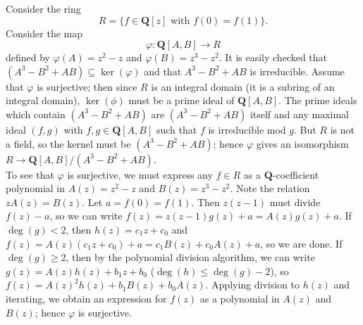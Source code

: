 \begin{example}
\label{example-affine-open-not-standard}
Consider the ring
$$
R = \{ f \in \mathbf{Q}[z]\text{ with }f(0) = f(1) \}.
$$
Consider the map
$$
\varphi:\mathbf{Q}[A,B]\to R
$$
defined by $\varphi(A)=z^2-z$ and $\varphi(B)=z^3-z^2$.  It is
easily checked that $(A^3-B^2+AB)\subseteq\ker(\varphi)$ and that
$A^3-B^2+AB$ is irreducible.  Assume that $\varphi$ is surjective;
then since $R$ is an integral domain (it is a subring of an integral
domain), $\ker(\phi)$ must be a prime ideal of $\mathbf{Q}[A,B]$.
The prime ideals which contain $(A^3-B^2+AB)$ are $(A^3-B^2+AB)$
itself and any maximal ideal $(f,g)$ with $f,g\in\mathbf{Q}[A,B]$
such that $f$ is irreducible mod $g$. But $R$ is not a field, so the
kernel must be $(A^3-B^2+AB)$; hence $\varphi$ gives an isomorphism
$R\to\mathbf{Q}[A,B]/(A^3-B^2+AB)$.\\
\indent To see that $\varphi$ is surjective, we must express any
$f\in R$ as a $\mathbf{Q}$-coefficient polynomial in $A(z)=z^2-z$
and $B(z)=z^3-z^2$. Note the relation $zA(z)=B(z)$. Let
$a=f(0)=f(1)$. Then $z(z-1)$ must divide $f(z)-a$, so we can write
$f(z)=z(z-1)g(z)+a=A(z)g(z)+a$.  If $\deg(g)<2$, then
$h(z)=c_1z+c_0$ and $f(z)=A(z)(c_1z+c_0)+a=c_1B(z)+c_0A(z)+a$, so we
are done.  If $\deg(g)\geq2$, then by the polynomial division
algorithm, we can write $g(z)=A(z)h(z)+b_1z+b_0$
($\deg(h)\leq\deg(g)-2$), so $f(z)=A(z)^2h(z)+b_1B(z)+b_0A(z)$.
Applying division to $h(z)$ and iterating, we obtain an expression
for $f(z)$ as a polynomial in $A(z)$ and $B(z)$; hence $\varphi$ is
surjective.


\end{example}
